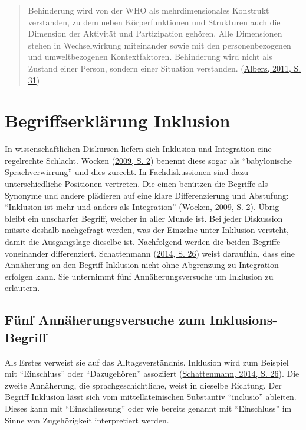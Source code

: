 \documentclass[
  ngerman,
  11pt,
  paper=a4,
  twoside,
  titlepage=true,
  openright,
  abstract=on,
  toc=listofnumbered,
  numbers=noenddot,
  chapterprefix=true,
  headings=optiontohead,
  svgnames,
  dvipsnames]{scrreprt}
\begin{document}
\begin{quote}
Behinderung wird von der WHO als mehrdimensionales Konstrukt verstanden,
zu dem neben Körperfunktionen und Strukturen auch die Dimension der
Aktivität und Partizipation gehören. Alle Dimensionen stehen in
Wechselwirkung miteinander sowie mit den personenbezogenen und
umweltbezogenen Kontextfaktoren. Behinderung wird nicht als Zustand
einer Person, sondern einer Situation verstanden.
(\protect\hyperlink{ref-albersmittendrin}{Albers, 2011, S. 31})
\end{quote}

\hypertarget{sec:integrationinklusion}{%
\section{Begriffserklärung Inklusion}\label{sec:integrationinklusion}}

In wissenschaftlichen Diskursen liefern sich Inklusion und Integration
eine regelrechte Schlacht. Wocken (\protect\hyperlink{ref-wocken}{2009,
S. 2}) benennt diese sogar als “babylonische Sprachverwirrung” und dies
zurecht. In Fachdiskussionen sind dazu unterschiedliche Positionen
vertreten. Die einen benützen die Begriffe als Synonyme und andere
plädieren auf eine klare Differenzierung und Abstufung: “Inklusion ist
mehr und anders als Integration” (\protect\hyperlink{ref-wocken}{Wocken,
2009, S. 2}). Übrig bleibt ein unscharfer Begriff, welcher in aller
Munde ist. Bei jeder Diskussion müsste deshalb nachgefragt werden, was
der Einzelne unter Inklusion versteht, damit die Ausgangslage dieselbe
ist. Nachfolgend werden die beiden Begriffe voneinander differenziert.
Schattenmann (\protect\hyperlink{ref-schattenmann_inklusion_2014}{2014,
S. 26}) weist daraufhin, dass eine Annäherung an den Begriff Inklusion
nicht ohne Abgrenzung zu Integration erfolgen kann. Sie unternimmt fünf
Annäherungsversuche um Inklusion zu erläutern.

\hypertarget{sec:annuxe4herungsversuch}{%
\subsection{Fünf Annäherungsversuche zum
Inklusions-Begriff}\label{sec:annuxe4herungsversuch}}

Als Erstes verweist sie auf das Alltagsverständnis. Inklusion wird zum
Beispiel mit “Einschluss” oder “Dazugehören” assoziiert
(\protect\hyperlink{ref-schattenmann_inklusion_2014}{Schattenmann, 2014,
S. 26}). Die zweite Annäherung, die sprachgeschichtliche, weist in
dieselbe Richtung. Der Begriff Inklusion lässt sich vom
mittellateinischen Substantiv “inclusio” ableiten. Dieses kann mit
“Einschliessung” oder wie bereits genannt mit “Einschluss” im Sinne von
Zugehörigkeit interpretiert werden.
\end{document}

